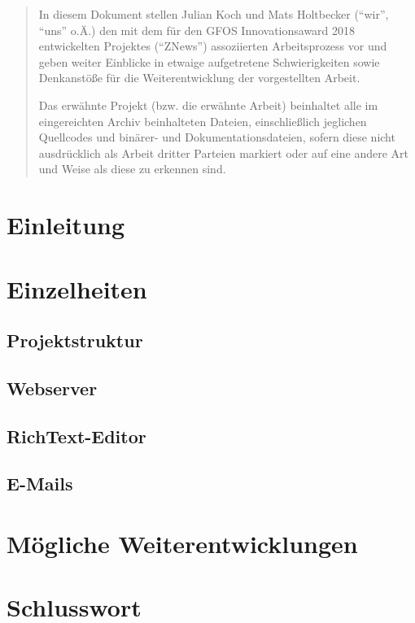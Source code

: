 

\newcommand*{\thetitle}{ZNews\\ Dokumentation}

\Begin

\begin{abstract}
    In diesem Dokument stellen Julian Koch und Mats Holtbecker
    (``wir'', ``uns'' o.Ä.)
    den mit dem für den GFOS Innovationsaward 2018 entwickelten Projektes (``ZNews'')
    assoziierten Arbeitsprozess vor
    und geben weiter Einblicke in etwaige aufgetretene Schwierigkeiten
    sowie Denkanstöße für die Weiterentwicklung der vorgestellten Arbeit.

    Das erwähnte Projekt (bzw. die erwähnte Arbeit)
    beinhaltet alle im eingereichten Archiv beinhalteten Dateien,
    einschließlich jeglichen Quellcodes und binärer- und Dokumentationsdateien,
    sofern diese nicht ausdrücklich als Arbeit dritter Parteien markiert
    oder auf eine andere Art und Weise als diese zu erkennen sind.
\end{abstract}

\newpage

\section{Einleitung}


\newpage

\section{Einzelheiten}

\subsection{Projektstruktur}


\subsection{Webserver}


\subsection{RichText-Editor}


\subsection{E-Mails}


\newpage

\section{Mögliche Weiterentwicklungen}


\newpage

\section{Schlusswort}


\End
